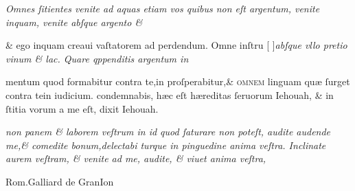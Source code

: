 \documentclass{article}
\begin{document}
{\begin{multicols}{2}
	\columnbreak
	\justifying
	\noindent
	\textit{Omnes ſitientes venite ad aquas etiam vos quibus non eſt argentum, venite inquam, venite abſque argento \&\linebreak}
\end{multicols}
\fontsize{6.25}{7}\selectfont
\vspace{-2.7\baselineskip}
\noindent \& ego inquam creaui vaſtatorem ad perdendum. Omne inſtru \hfill[\hfill %
	{\grecs {}\selectfont{}}\hfill]\hfill \textit{abſque vllo pretio vinum \& lac. Quare qppenditis argentum in}
\vspace{-1.6\baselineskip}
\begin{multicols}{2}
	\fontsize{6.25}{7}\selectfont
	\justifying
	\noindent mentum quod formabitur contra te,in proſperabitur,\& \textsc{ omnem} linguam qu\ae{} ſurget contra tein iudicium.\linebreak
	condemnabis, h\ae{}c eſt h\ae{}reditas ſeruorum Iehouah, \& in ſtitia vorum a me eſt, dixit Iehouah.

	\columnbreak
	\justifying
	\noindent
	\textit{non panem \& laborem veſtrum in id quod ſaturare non poteſt, audite audende me,\& comedite bonum,delectabi\linebreak
		turque in pinguedine anima veſtra. Inclinate aurem veſtram, \& venite ad me, audite, \& viuet anima veſtra,\linebreak
	}
\end{multicols}
\vspace{-3.5\baselineskip}
\setlength{\columnsep}{3mm}
\begin{multicols}{4}
	\tiny
	\centering
	Rom.Galliard de GranIon\\
	\vspace{\baselineskip}
	\fontsize{4}{4.5}\selectfont
	\justifying
	\noindent {}


\end{multicols}}
\end{document}
